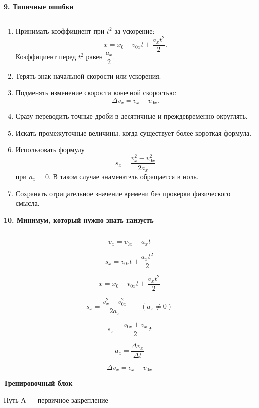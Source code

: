 \documentclass[a4paper,12pt]{article}
\newcommand{\sectiontitle}[1]{%
  \vspace{2mm}
  {\Large\bfseries\color{darkaccent}#1}\par
  \vspace{1mm}
  {\color{accent}\rule{\linewidth}{0.5pt}}
  \vspace{3mm}
}
\begin{document}
\sectiontitle{9. Типичные ошибки}

\begin{enumerate}
  \item Принимать коэффициент при \(t^2\) за ускорение:
  \[
  x=x_0+v_{0x}t+\frac{a_xt^2}{2}.
  \]
  Коэффициент перед \(t^2\) равен \(\dfrac{a_x}{2}\).

  \item Терять знак начальной скорости или ускорения.

  \item Подменять изменение скорости конечной скоростью:
  \[
  \Delta v_x=v_x-v_{0x}.
  \]

  \item Сразу переводить точные дроби в десятичные и преждевременно округлять.

  \item Искать промежуточные величины, когда существует более короткая формула.

  \item Использовать формулу
  \[
  s_x=\frac{v_x^2-v_{0x}^2}{2a_x}
  \]
  при \(a_x=0\). В таком случае знаменатель обращается в ноль.

  \item Сохранять отрицательное значение времени без проверки физического смысла.
\end{enumerate}

\sectiontitle{10. Минимум, который нужно знать наизусть}

\[
\boxed{
v_x=v_{0x}+a_xt
}
\]

\[
\boxed{
s_x=v_{0x}t+\frac{a_xt^2}{2}
}
\]

\[
\boxed{
x=x_0+v_{0x}t+\frac{a_xt^2}{2}
}
\]

\[
\boxed{
s_x=\frac{v_x^2-v_{0x}^2}{2a_x}
}
\qquad (a_x\ne0)
\]

\[
\boxed{
s_x=\frac{v_{0x}+v_x}{2}\,t
}
\]

\[
\boxed{
a_x=\frac{\Delta v_x}{\Delta t}
}
\]

\[
\boxed{
\Delta v_x=v_x-v_{0x}
}
\]

\clearpage

\thispagestyle{plain}

\begin{center}
{\LARGE\bfseries\color{darkaccent}
Тренировочный блок}

\vspace{2mm}

{\large
Путь А --- первичное закрепление}
\end{center}
\end{document}
